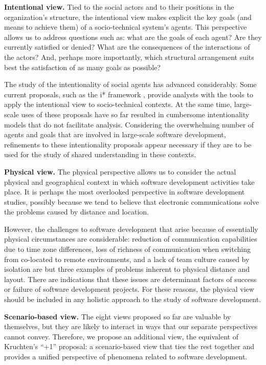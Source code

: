 \textbf{Intentional view.} Tied to the social actors and to their positions in the organization's structure, the intentional view makes explicit the key goals (and means to achieve them) of a socio-technical system's agents. This perspective allows us to address questions such as: what are the goals of each agent? Are they currently satisfied or denied? What are the consequences of the interactions of the actors? And, perhaps more importantly, which structural arrangement suits best the satisfaction of as many goals as possible?

The study of the intentionality of social agents has advanced considerably. Some current proposals, such as the i* framework \cite{Yu1997}, provide analysts with the tools to apply the intentional view to socio-technical contexts. At the same time, large-scale uses of these proposals have so far resulted in cumbersome intentionality models that do not facilitate analysis. Considering the overwhelming number of agents and goals that are involved in large-scale software development, refinements to these intentionality proposals appear necessary if they are to be used for the study of shared understanding in these contexts.

\textbf{Physical view.} The physical perspective allows us to consider the actual physical and geographical context in which software development activities take place. It is perhaps the most overlooked perspective in software development studies, possibly because we tend to believe that electronic communications solve the problems caused by distance and location.

However, the challenges to software development that arise because of essentially physical circumstances are considerable: reduction of communication capabilities due to time zone differences, loss of richness of communication when switching from co-located to remote environments, and a lack of team culture caused by isolation are but three examples of problems inherent to physical distance and layout. There are indications that these issues are determinant factors of success or failure of software development projects. For these reasons, the physical view should be included in any holistic approach to the study of software development.

\textbf{Scenario-based view.} The eight views proposed so far are valuable by themselves, but they are likely to interact in ways that our separate perspectives cannot convey. Therefore, we propose an additional view, the equivalent of Kruchten's ``+1'' proposal: a scenario-based view that ties the rest together and provides a unified perspective of phenomena related to software development.

